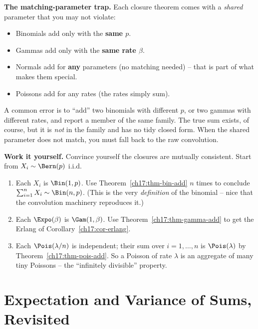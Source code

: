 \begin{trapbox}
\textbf{The matching-parameter trap.} Each closure theorem comes with a
\emph{shared} parameter that you may not violate:
\begin{itemize}
  \item Binomials add only with the \textbf{same $p$}.
  \item Gammas add only with the \textbf{same rate $\beta$}.
  \item Normals add for \textbf{any} parameters (no matching needed) --
        that is part of what makes them special.
  \item Poissons add for any rates (the rates simply sum).
\end{itemize}
A common error is to ``add'' two binomials with different $p$, or two
gammas with different rates, and report a member of the same family. The
true sum exists, of course, but it is \emph{not} in the family and has no
tidy closed form. When the shared parameter does not match, you must fall
back to the raw convolution.
\end{trapbox}

\begin{labbox}
\textbf{Work it yourself.} Convince yourself the closures are mutually
consistent. Start from $X_i\sim\Bern(p)$ i.i.d.
\begin{enumerate}
  \item Each $X_i$ is $\Bin(1,p)$. Use Theorem~\ref{ch17:thm-bin-add}
        $n$ times to conclude $\sum_{i=1}^n X_i\sim\Bin(n,p)$. (This is
        the very \emph{definition} of the binomial -- nice that the
        convolution machinery reproduces it.)
  \item Each $\Expo(\beta)$ is $\Gam(1,\beta)$. Use
        Theorem~\ref{ch17:thm-gamma-add} to get the Erlang of
        Corollary~\ref{ch17:cor-erlang}.
  \item Each $\Pois(\lambda/n)$ is independent; their sum over $i=1,\dots,n$
        is $\Pois(\lambda)$ by Theorem~\ref{ch17:thm-pois-add}. So a
        Poisson of rate $\lambda$ is an aggregate of many tiny Poissons --
        the ``infinitely divisible'' property.
\end{enumerate}
\end{labbox}

\section{Expectation and Variance of Sums, Revisited}
\label{ch17:mean-var}

